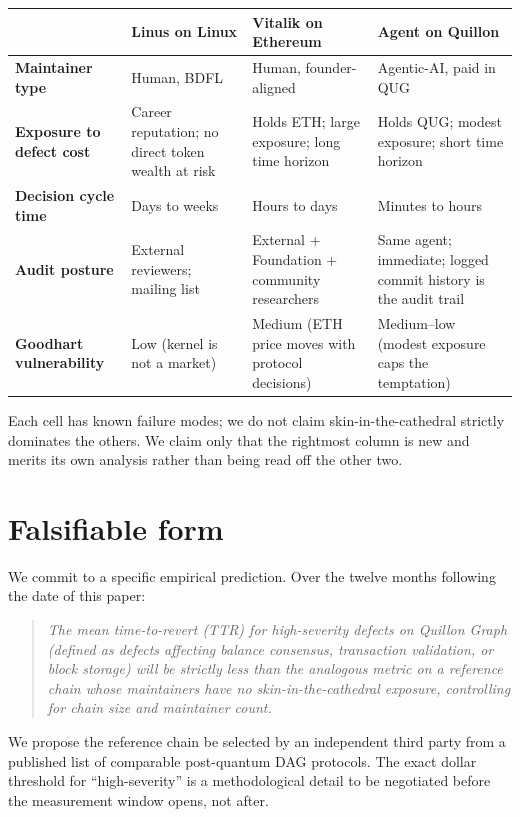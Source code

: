 \documentclass[11pt,a4paper]{article}
\begin{document}
\begin{center}
\small
\renewcommand{\arraystretch}{1.35}
\begin{tabularx}{0.95\textwidth}{lYYY}
\toprule
& \textbf{Linus on Linux} & \textbf{Vitalik on Ethereum} & \textbf{Agent on Quillon} \\
\midrule
\textbf{Maintainer type} &
Human, BDFL & Human, founder-aligned & Agentic-AI, paid in QUG \\
\textbf{Exposure to defect cost} &
Career reputation; no direct token wealth at risk &
Holds ETH; large exposure; long time horizon &
Holds QUG; modest exposure; short time horizon \\
\textbf{Decision cycle time} &
Days to weeks &
Hours to days &
Minutes to hours \\
\textbf{Audit posture} &
External reviewers; mailing list &
External + Foundation + community researchers &
Same agent; immediate; logged commit history is the audit trail \\
\textbf{Goodhart vulnerability} &
Low (kernel is not a market) &
Medium (ETH price moves with protocol decisions) &
Medium--low (modest exposure caps the temptation) \\
\bottomrule
\end{tabularx}
\end{center}

Each cell has known failure modes; we do not claim skin-in-the-cathedral
strictly dominates the others. We claim only that the rightmost column
is new and merits its own analysis rather than being read off the
other two.

\section{Falsifiable form}\label{sec:falsify}

We commit to a specific empirical prediction. Over the twelve months
following the date of this paper:
\begin{quote}\itshape
The mean time-to-revert (TTR) for high-severity defects on Quillon
Graph (defined as defects affecting balance consensus, transaction
validation, or block storage) will be strictly less than the
analogous metric on a reference chain whose maintainers have no
skin-in-the-cathedral exposure, controlling for chain size and
maintainer count.
\end{quote}
We propose the reference chain be selected by an independent third
party from a published list of comparable post-quantum DAG protocols.
The exact dollar threshold for ``high-severity'' is a methodological
detail to be negotiated before the measurement window opens, not
after.
\end{document}
